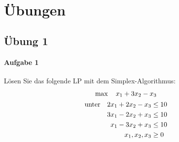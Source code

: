 \documentclass[
a4paper, %
11pt,
]
{scrartcl}
\begin{document}
\section{Übungen}%
\label{sec:ubungen}

\subsection{Übung 1}%
\label{sub:ubung_1}

\paragraph{Aufgabe 1}%
\label{par:aufgabe_1}
Lösen Sie das folgende LP mit dem Simplex-Algorithmus:
\begin{gather*}
  \max \quad x_1 + 3 x_2 - x_3\\
  \begin{aligned}
    \textup{unter}
    \quad
    2 x_1 + 2 x_2 - x_3 & \leq 10\\
    3 x_1 - 2 x_2 + x_3 & \leq 10\\
    x_1   - 3 x_2 + x_3 & \leq 10\\
    x_1, x_2, x_3       & \geq 0
  \end{aligned}
\end{gather*}
\end{document}
